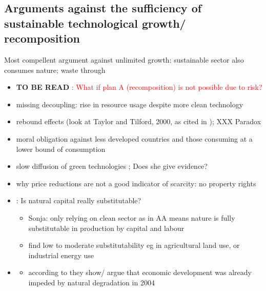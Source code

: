 \documentclass[12pt]{article}
\newcommand{\tr}[1]{\textcolor{red}{#1}}
\begin{document}
\subsection{Arguments against the sufficiency of sustainable technological growth/ recomposition}
Most compellent argument against unlimited growth: sustainable sector also consumes nature; waste through 
\begin{itemize}
	\item \textbf{TO BE READ} \tr{\cite{FuglesangClimateHowitt}:  What if plan A (recomposition) is not possible due to risk?}
\item missing decoupling: rise in  resource usage despite more clean technology \citep{Alexander2012TheContext}
\item rebound effects (look at Taylor and Tilford, 2000, as cited in \cite{Schor2005SustainableReduction}); XXX Paradox \citep{Alexander2012TheContext}
\item moral obligation against less developed countries and those consuming at a lower bound of consumption \citep{Alexander2012TheContext}
\item slow diffusion of green technologies \citep{Schor2005SustainableReduction}; Does she give evidence?
\item why price reductions are not a good indicator of scarcity: no property rights \citep{Schor2005SustainableReduction}
\item \cite{Cohen2019AnnualSubstitutable}: Is natural capital really substitutable?
\begin{itemize}
\item Sonja: only relying on clean sector as in AA means nature is fully substitutable in production by capital and labour
\item find low to moderate substitutability eg in agricultural land use, or industrial energy use
\end{itemize}
\item \cite{Arrow2004AreMuch}
\begin{itemize}
\item according to \cite{Cohen2019AnnualSubstitutable} they show/ argue that economic development was already impeded by natural degradation in 2004
\end{itemize}
\end{itemize}
\end{document}
